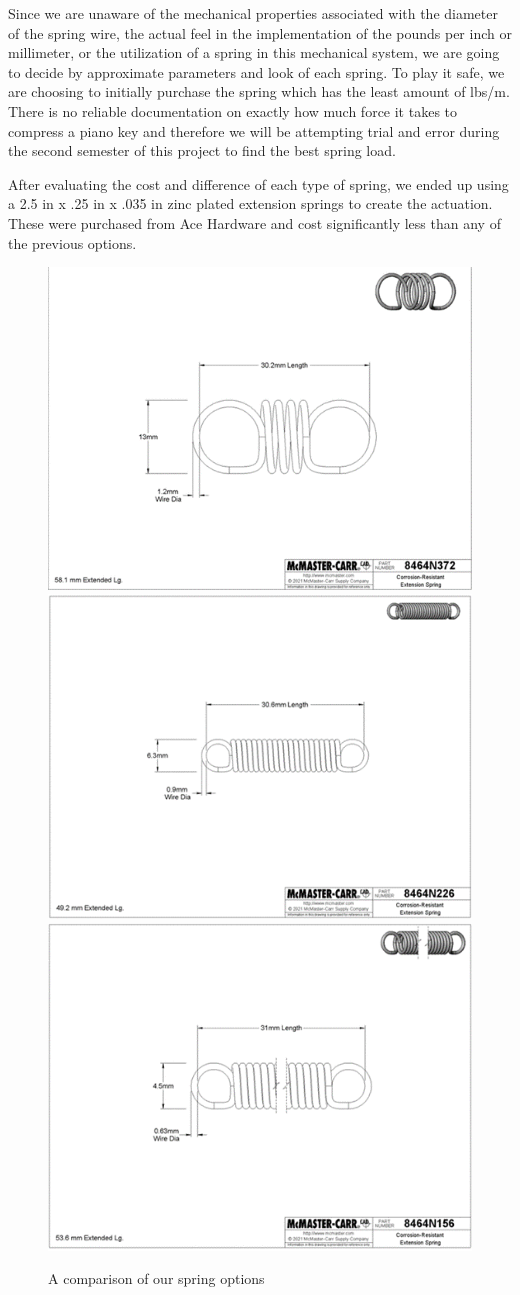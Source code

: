 Since we are unaware of the mechanical properties associated with the diameter of the spring wire, the actual feel in the implementation of the pounds per inch or millimeter, or the utilization of a spring in this mechanical system, we are going to decide by approximate parameters and look of each spring. To play it safe, we are choosing to initially purchase the spring which has the least amount of lbs/m. There is no reliable documentation on exactly how much force it takes to compress a piano key and therefore we will be attempting trial and error during the second semester of this project to find the best spring load.

After evaluating the cost and difference of each type of spring, we ended up using a 2.5 in x .25 in x .035 in zinc plated extension springs to create the actuation. These were purchased from Ace Hardware and cost significantly less than any of the previous options.

\newpage
\begin{figure}[h!]
  \centering
  \includegraphics[width=0.6\linewidth]{image/Spring1.png}
  \includegraphics[width=0.6\linewidth]{image/Spring2.png}
  \includegraphics[width=0.6\linewidth]{image/Spring3.png}
  \caption{A comparison of our spring options}
  \label{fig:springs}
\end{figure}
\newpage

